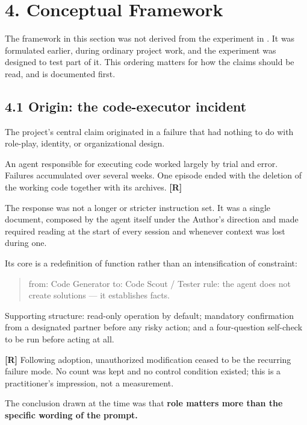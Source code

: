 \section*{4. Conceptual Framework}
\label{sec:en:4}

The framework in this section was not derived from the experiment in . It was formulated earlier, during ordinary project work, and the experiment was designed to test part of it. This ordering matters for how the claims should be read, and is documented first.


\subsection*{4.1 Origin: the code-executor incident}
\label{sec:en:4.1}

The project's central claim originated in a failure that had nothing to do with role-play, identity, or organizational design.

An agent responsible for executing code worked largely by trial and error. Failures accumulated over several weeks. One episode ended with the deletion of the working code together with its archives. \textbf{[R]}

The response was not a longer or stricter instruction set. It was a single document, composed by the agent itself under the Author's direction and made required reading at the start of every session and whenever context was lost during one.

Its core is a redefinition of function rather than an intensification of constraint:

\begin{quote}
from: Code Generator to: Code Scout / Tester rule: the agent does not create solutions — it establishes facts.
\end{quote}
Supporting structure: read-only operation by default; mandatory confirmation from a designated partner before any risky action; and a four-question self-check to be run before acting at all.

\textbf{[R]} Following adoption, unauthorized modification ceased to be the recurring failure mode. No count was kept and no control condition existed; this is a practitioner's impression, not a measurement.

The conclusion drawn at the time was that \textbf{role matters more than the specific wording of the prompt.}

